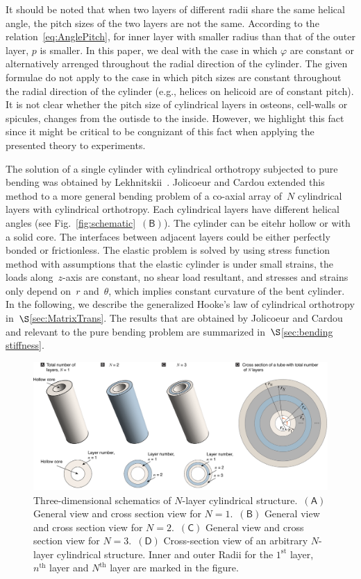 \documentclass[preprint,12pt,times]{elsarticle}
\numberwithin{equation}{section}
\newcommand{\pr}[1]{\left( #1 \right)}
\newcommand{\subf}[1]{\pr{\textsf{#1}}}
\renewcommand{\>}{$\Rightarrow$}
\begin{document}
It should be noted that when two layers of different radii share the same helical angle, the pitch sizes of the two layers are not the same. According to the relation~\eqref{eq:AnglePitch}, for inner layer with smaller radius than that of the outer layer, $p$ is smaller. In this paper, we deal with the case in which $\varphi$ are constant or alternatively arrenged throughout the radial direction of the cylinder. The given formulae do not apply to the case in which pitch sizes are constant throughout the radial direction of the cylinder (e.g., helices on helicoid are of constant pitch). It is not clear whether the pitch size of cylindrical layers in osteons, cell-walls or spicules, changes from the outisde to the inside. However, we highlight this fact since it might be critical to be congnizant of this fact when applying the presented theory to experiments.

The solution of a single cylinder with cylindrical orthotropy subjected to pure bending was obtained by Lekhnitskii~\cite{Lekhnitskii1981}. Jolicoeur and Cardou extended this method to a more general bending problem of a co-axial array of~$N$ cylindrical layers with cylindrical orthotropy. Each cylindrical layers have different helical angles (see Fig.~\ref{fig:schematic}~$\subf{B}$). The cylinder can be eitehr hollow or with a solid core. The interfaces between adjacent layers could be either perfectly bonded or frictionless. The elastic problem is solved by using stress function method with assumptions that the elastic cylinder is under small strains, the loads along~$z$-axis are constant, no shear load resultant, and stresses and strains only depend on~$r$ and~$\theta$, which implies constant curvature of the bent cylinder. In the following, we describe the generalized Hooke's law of cylindrical orthotropy in~$\S$\ref{sec:MatrixTrans}. The results that are obtained by Jolicoeur and Cardou and relevant to the pure bending problem are summarized in~$\S$\ref{sec:bending stiffness}.


\begin{figure}[t]
  \centering
  \graphicspath{{../LyxFiles/figure/}}
   \includegraphics[width=\textwidth]{Cylinder3D_V4.pdf}
  \caption{Three-dimensional schematics of  $N$-layer cylindrical structure.~$\subf{A}$ General view and cross section view for $N = 1$.~$\subf{B}$ General view and cross section view for $N = 2$.~$\subf{C}$ General view and cross section view for $N = 3$.~$\subf{D}$ Cross-section view of an arbitrary $N$-layer cylindrical structure. Inner and outer Radii for the $1^\text{st}$ layer, $n^\text{th}$ layer and $N^\text{th}$ layer are marked in the figure.}
  \label{fig:Cylinder3D}
\end{figure}
\end{document}

